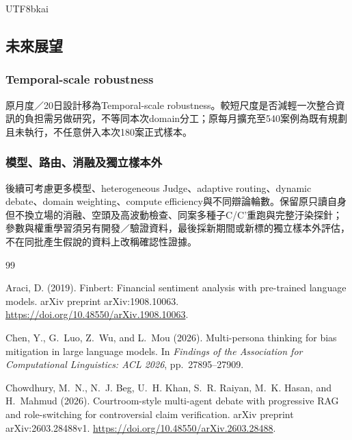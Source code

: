 \documentclass[12pt,a4paper]{article}
\begin{document}
\begin{CJK}{UTF8}{bkai}
\subsection{未來展望}

\subsubsection{Temporal-scale robustness}

原月度／20日設計移為Temporal-scale robustness。較短尺度是否減輕一次整合資訊的負担需另做研究，不等同本次domain分工；原每月擴充至540案例為既有規劃且未執行，不任意併入本次180案正式樣本。

\subsubsection{模型、路由、消融及獨立樣本外}

後續可考慮更多模型、heterogeneous Judge、adaptive routing、dynamic debate、domain weighting、compute efficiency與不同辯論輪數。保留原只讀自身但不換立場的消融、空頭及高波動檢查、同案多種子C/C'重跑與完整汙染探針；參數與權重學習須另有開發／驗證資料，最後採新期間或新標的獨立樣本外評估，不在同批產生假說的資料上改稱確認性證據。

\clearpage
\setcounter{section}{7}
\renewcommand{\refname}{七、參考文獻}
\begin{thebibliography}{99}

Araci, D. (2019).
\newblock Finbert: Financial sentiment analysis with pre-trained language
  models.
\newblock arXiv preprint arXiv:1908.10063.
\newblock \url{https://doi.org/10.48550/arXiv.1908.10063}.

Chen, Y., G.~Luo, Z.~Wu, and L.~Mou (2026).
\newblock Multi-persona thinking for bias mitigation in large language models.
\newblock In {\em Findings of the Association for Computational Linguistics:
  ACL 2026}, pp.\  27895--27909.

Chowdhury, M.~N., N.~J. Beg, U.~H. Khan, S.~R. Raiyan, M.~K. Hasan, and
  H.~Mahmud (2026).
\newblock Courtroom-style multi-agent debate with progressive {RAG} and
  role-switching for controversial claim verification.
\newblock arXiv preprint arXiv:2603.28488v1.
\newblock \url{https://doi.org/10.48550/arXiv.2603.28488}.


\end{thebibliography}
\end{CJK}
\end{document}

